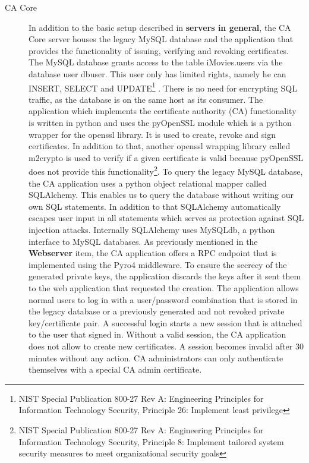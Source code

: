 \documentclass[a4paper, toc=index, 12pt, DIV14, twoside, BCOR2cm, headsepline, numbers=noenddot, bibliography=totoc]{report}
\begin{document}
\begin{description}
\item[CA Core ] In addition to the basic setup described in {\bfseries servers in general}, the CA Core server houses the legacy MySQL database and the application that provides the functionality of issuing, verifying and revoking certificates. \newline
The MySQL database grants access to the table iMovies.users via the database user dbuser. This user only has limited rights, namely he can INSERT, SELECT and UPDATE\footnote{NIST Special Publication 800-27 Rev A: Engineering Principles for Information Technology Security, Principle 26: Implement least privilege}
. There is no need for encrypting SQL traffic, as the database is on the same host as its consumer.\newline
The application which implements the certificate authority (CA) functionality is written in python and uses the pyOpenSSL module which is a python wrapper for the openssl library. It is used to create, revoke and sign certificates. In addition to that, another openssl wrapping library called m2crypto is used to verify if a given certificate is valid because pyOpenSSL does not provide this functionality\footnote{NIST Special Publication 800-27 Rev A: Engineering Principles for Information Technology Security, Principle 8: Implement tailored system security measures to meet organizational security
goals}.\newline
To query the legacy MySQL database, the CA application uses a python object relational mapper called SQLAlchemy. This enables us to query the database without writing our own SQL statements. In addition to that SQLAlchemy automatically escapes user input in all statements which serves as protection against SQL injection attacks. Internally SQLAlchemy uses MySQLdb, a python interface to MySQL databases.\newline
As previously mentioned in the {\bfseries Webserver} item, the CA application offers a RPC endpoint that is implemented using the Pyro4 middleware.\newline
To ensure the secrecy of the generated private keys, the application discards the keys after it sent them to the web application that requested the creation.\newline
The application allows normal users to log in with a user/password combination that is stored in the legacy database or a previously generated and not revoked private key/certificate pair. A successful login starts a new session that is attached to the user that signed in. Without a valid session, the CA application does not allow to create new certificates. A session becomes invalid after 30 minutes without any action. CA administrators can only authenticate themselves with a special CA admin certificate.\newline

\end{description}
\end{document}
